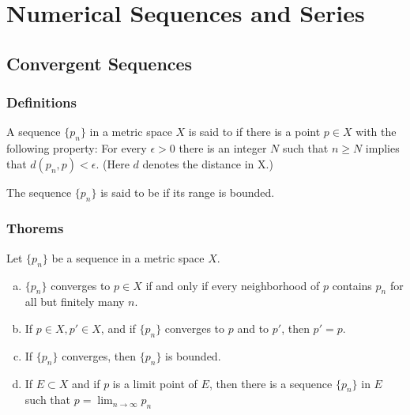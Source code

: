 \chapter{Numerical Sequences and Series}

\section{Convergent Sequences}
\subsection{Definitions}
\begin{deff}
	A sequence $\{p_n\}$ in a metric space $X$ is said to {}  if there is a point $p \in X$ with the following property: For every $\epsilon > 0$ there is an integer $N$ such that $n \ge N$ implies that $d(p_n,p) < \epsilon$. (Here $d$ denotes the distance in X.)	
\end{deff}

\begin{deff}
	The sequence $\{p_n\}$ is said to be {} if its range is bounded.
\end{deff}

\subsection{Thorems}
\begin{thm}\label{thm:convergent seq}
	Let $\{p_n\}$ be a sequence in a metric space $X$.
	\begin{enumerate}[(a)]
		\item $\{p_n\}$ converges to $p \in X$ if and only if every neighborhood of $p$ contains $p_n$ for all but finitely many $n$.
		\item If $p \in X, p' \in X$, and if $\{p_n\}$ converges to $p$ and to $p'$, then $p'=p$.
		\item If $\{p_n\}$ converges, then $\{p_n\}$ is bounded.
		\item If $E \subset X$ and if $p$ is a limit point  of $E$, then there is a sequence $\{p_n\}$ in $E$ such that $p = \lim_{n \to \infty} p_n$
	\end{enumerate}
\end{thm}


